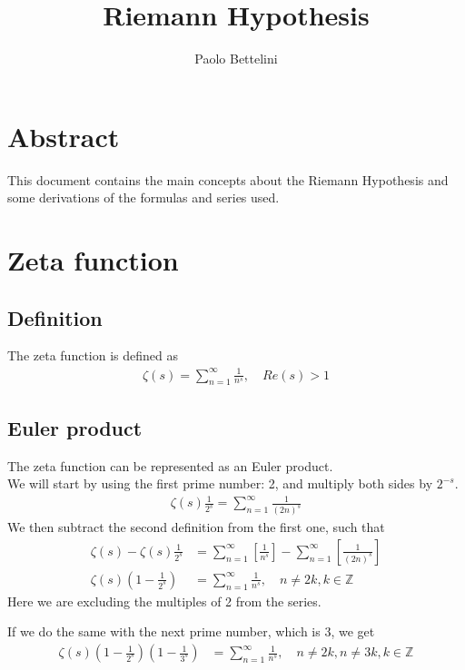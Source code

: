 \documentclass[a4paper]{article}
\title{Riemann Hypothesis}
\author{Paolo Bettelini}
\date{}
\begin{document}
\maketitle

\section*{Abstract}
This document contains the main concepts about the
Riemann Hypothesis and some derivations of the formulas and series used.

\pagebreak

\tableofcontents
\pagebreak

\section{Zeta function}

\subsection{Definition}
The zeta function is defined as
\begin{align*}
    \zeta(s)=\sum_{n=1}^{\infty}\frac{1}{n^s},\quad Re(s)>1
\end{align*}

\subsection{Euler product}
The zeta function can be represented as an Euler product.
\\
We will start by using the first prime number: 2, and multiply both sides by \(2^{-s}\).
\begin{align*}
    \zeta(s)\frac{1}{2^s}=\sum_{n=1}^{\infty}\frac{1}{{(2n)}^s}
\end{align*}
We then subtract the second definition from the first one, such that
\begin{align*}
    \zeta(s)-\zeta(s)\frac{1}{2^s}&=
    \sum_{n=1}^{\infty}\left[\frac{1}{n^s}\right]-
    \sum_{n=1}^{\infty}\left[\frac{1}{{(2n)}^s}\right]
    \\
    \zeta(s)\left(1-\frac{1}{2^s}\right)&=
    \sum_{n=1}^{\infty}\frac{1}{n^s},
    \quad n\neq 2k,k\in \mathbb{Z}
\end{align*}
Here we are excluding the multiples of 2 from the series.

If we do the same with the next prime number, which is 3, we get
\begin{align*}
    \zeta(s)\left(1-\frac{1}{2^s}\right)\left(1-\frac{1}{3^s}\right)&=
    \sum_{n=1}^{\infty}\frac{1}{n^s},
    \quad n\neq 2k,n\neq 3k, k\in \mathbb{Z}
\end{align*}
\end{document}
